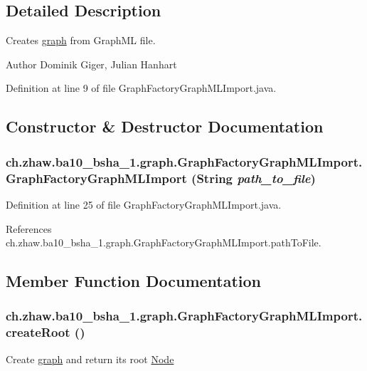 \subsection{Detailed Description}
Creates \hyperlink{namespacech_1_1zhaw_1_1ba10__bsha__1_1_1graph}{graph} from GraphML file.

\begin{DoxyAuthor}{Author}
Dominik Giger, Julian Hanhart 
\end{DoxyAuthor}


Definition at line 9 of file GraphFactoryGraphMLImport.java.

\subsection{Constructor \& Destructor Documentation}
\hypertarget{classch_1_1zhaw_1_1ba10__bsha__1_1_1graph_1_1GraphFactoryGraphMLImport_ace03ca9ee48806f41a9a9221c6dec29e}{
\subsubsection[{GraphFactoryGraphMLImport}]{\setlength{\rightskip}{0pt plus 5cm}ch.zhaw.ba10\_\-bsha\_\-1.graph.GraphFactoryGraphMLImport.GraphFactoryGraphMLImport (String {\em path\_\-to\_\-file})}}
\label{classch_1_1zhaw_1_1ba10__bsha__1_1_1graph_1_1GraphFactoryGraphMLImport_ace03ca9ee48806f41a9a9221c6dec29e}


Definition at line 25 of file GraphFactoryGraphMLImport.java.

References ch.zhaw.ba10\_\-bsha\_\-1.graph.GraphFactoryGraphMLImport.pathToFile.

\subsection{Member Function Documentation}
\hypertarget{classch_1_1zhaw_1_1ba10__bsha__1_1_1graph_1_1GraphFactoryGraphMLImport_a2936d100be1654461056080ff61edd32}{
\subsubsection[{createRoot}]{ ch.zhaw.ba10\_\-bsha\_\-1.graph.GraphFactoryGraphMLImport.createRoot ()}}
\label{classch_1_1zhaw_1_1ba10__bsha__1_1_1graph_1_1GraphFactoryGraphMLImport_a2936d100be1654461056080ff61edd32}
Create \hyperlink{namespacech_1_1zhaw_1_1ba10__bsha__1_1_1graph}{graph} and return its root \hyperlink{classch_1_1zhaw_1_1ba10__bsha__1_1_1graph_1_1Node}{Node}

